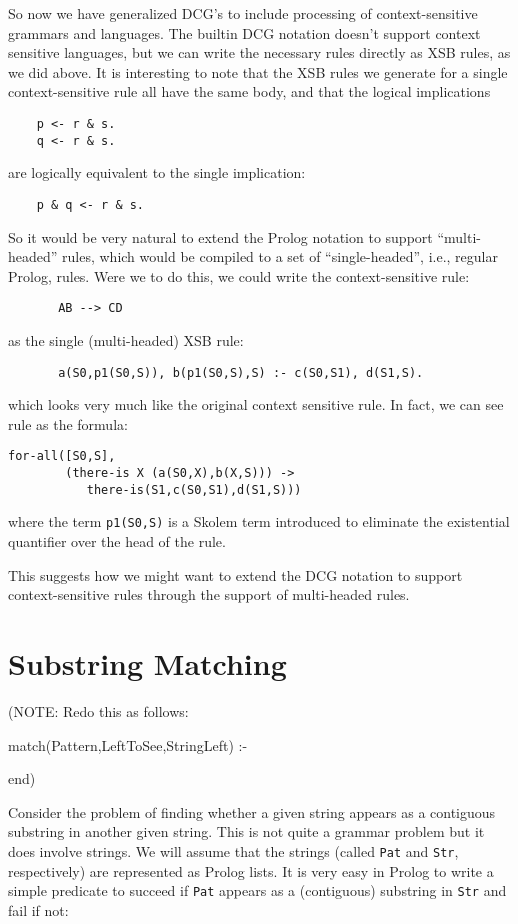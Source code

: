 So now we have generalized DCG's to include processing of
context-sensitive grammars and languages.  The builtin DCG notation
doesn't support context sensitive languages, but we can write the
necessary rules directly as XSB rules, as we did above.  It is
interesting to note that the XSB rules we generate for a single
context-sensitive rule all have the same body, and that the logical
implications
\begin{verbatim}
    p <- r & s.
    q <- r & s.
\end{verbatim}
are logically equivalent to the single implication:
\begin{verbatim}
    p & q <- r & s.
\end{verbatim}
So it would be very natural to extend the Prolog notation to support
``multi-headed'' rules, which would be compiled to a set of
``single-headed'', i.e., regular Prolog, rules. Were we to do this, we
could write the context-sensitive rule:
\begin{verbatim}
       AB --> CD
\end{verbatim}
as the single (multi-headed) XSB rule:
\begin{verbatim}
       a(S0,p1(S0,S)), b(p1(S0,S),S) :- c(S0,S1), d(S1,S).
\end{verbatim}
which looks very much like the original context sensitive rule.  In
fact, we can see rule as the formula:
\begin{verbatim}
for-all([S0,S],
        (there-is X (a(S0,X),b(X,S))) -> 
           there-is(S1,c(S0,S1),d(S1,S)))
\end{verbatim}
where the term \verb|p1(S0,S)| is a Skolem term introduced to
eliminate the existential quantifier over the head of the rule.

This suggests how we might want to extend the DCG notation to support
context-sensitive rules through the support of multi-headed rules.

\section{Substring Matching}

(NOTE: Redo this as follows:

match(Pattern,LeftToSee,StringLeft) :-



end)

Consider the problem of finding whether a given string appears as a
contiguous substring in another given string.  This is not quite a
grammar problem but it does involve strings.  We will assume that the
strings (called \verb|Pat| and \verb|Str|, respectively) are
represented as Prolog lists.  It is very easy in Prolog to write a
simple predicate to succeed if \verb|Pat| appears as a (contiguous)
substring in \verb|Str| and fail if not:

